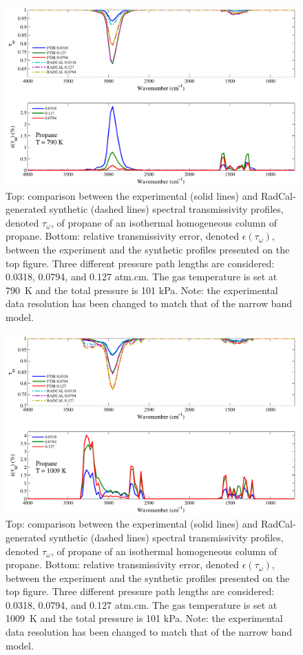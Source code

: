\begin{figure}[p]
\includegraphics[width=\textwidth]{../Verification/Results_Test2/Propane_790.pdf}
\caption{Top: comparison between the experimental (solid lines) and RadCal-generated synthetic (dashed lines) spectral transmissivity profiles, denoted $\tau_{\omega}$, of propane of an isothermal homogeneous column of propane. Bottom: relative transmissivity error, denoted $\epsilon{(\tau_{\omega})}$, between the experiment and the synthetic profiles presented on the top figure. Three different pressure path lengths are considered: 0.0318, 0.0794, and 0.127 atm.cm. The gas temperature is set at 790~K and the total pressure is 101 kPa. Note: the experimental data resolution has been changed to match that of the narrow band model. \label{fig:propane_Verify_790K}}
\end{figure}

\begin{figure}[p]
\includegraphics[width=\textwidth]{../Verification/Results_Test2/Propane_1009.pdf}
\caption{Top: comparison between the experimental (solid lines) and RadCal-generated synthetic (dashed lines) spectral transmissivity profiles, denoted $\tau_{\omega}$, of propane of an isothermal homogeneous column of propane. Bottom: relative transmissivity error, denoted $\epsilon{(\tau_{\omega})}$, between the experiment and the synthetic profiles presented on the top figure. Three different pressure path lengths are considered: 0.0318, 0.0794, and 0.127 atm.cm. The gas temperature is set at 1009~K and the total pressure is 101 kPa. Note: the experimental data resolution has been changed to match that of the narrow band model. \label{fig:propane_Verify_1009K}}
\end{figure}


